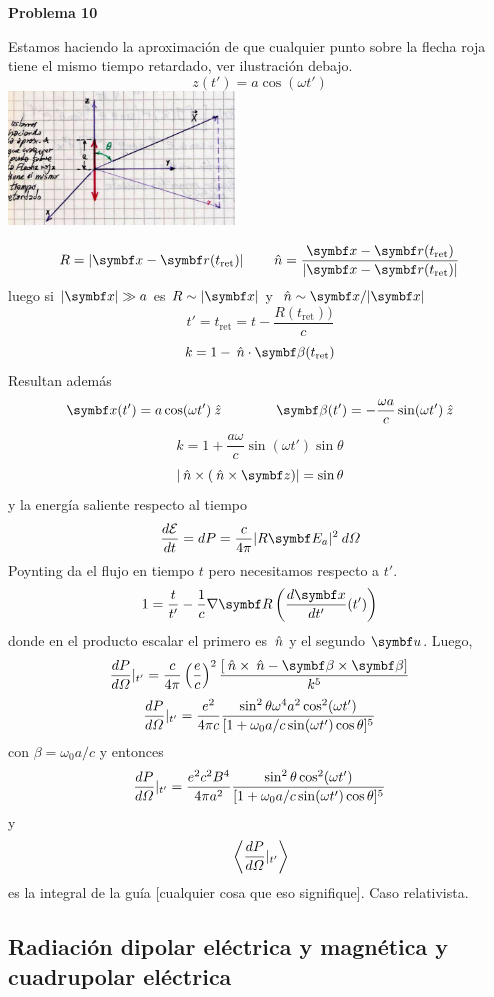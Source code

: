 \documentclass[10pt,oneside]{CBFT_book}
\begin{document}
\begin{ejemplo}{\bf Problema 10}

Estamos haciendo la aproximación de que cualquier punto sobre la flecha roja tiene el mismo
tiempo retardado, ver ilustración debajo.
\[
	z(t') = a \cos( \omega t' )
\]
\includegraphics[width=0.45\textwidth]{images/fig_ft1_antena_probl.jpg}

\[
	R = | \vbx - \vb{r}(t_\text{ret}) | \qquad 
	\nver = \frac{ \vbx - \vb{r}(t_\text{ret}) }{| \vbx - \vb{r}(t_\text{ret}) |}
\]
luego si $|\vbx|\gg a$ es $ R \sim |\vbx| $ y $ \nver \sim \vbx/|\vbx|$
\[
	t'= t_\text{ret} = t - \frac{R(t_\text{ret}))}{c}
\]
\[
	k = 1 - \nver\cdot\vb{\b}(t_\text{ret})
\]
Resultan además
\[
	\vb{x}(t') = a \cos(\omega t') \zver \qquad \qquad 
	\vb{\b}(t') = - \frac{\omega a}{c} \sin(\omega t')\zver
\]
\[
	k = 1 + \frac{a\omega}{c}\sin(\omega t')\sin\theta
\]
\[
	|\nver\times(\nver\times\vb{z})| = \sin\theta
\]
y la energía saliente respecto al tiempo 
\[
	\dtot{\mathcal{E}}{t} = dP = \frac{c}{4\pi} | R \vb{E}_a |^2 \: d\Omega
\]
Poynting da el flujo en tiempo $t$ pero necesitamos respecto a $t'$.
\[
	1 = \frac{t}{t'} - \frac{1}{c} \nabla\vb{R} \left( \dtot{\vbx}{t'}(t') \right)
\]
donde en el producto escalar el primero es $\:\hat{n}$ y el segundo $\vb u$. Luego,
\[
	\dtot{P}{\Omega}|_{t'} = \frac{ c }{ 4 \pi } \Frac{e}{c}^2 
	\frac{[ \nver \times {\nver - \vb{\b}}\times\vb{\b}]}{k^5}
\]
\[
	\frac{d^{\hspace{-0.05em}} {P}}{d {\Omega}^{\hspace{-0.05em}}}|_{t'} = \frac{ e^2 }{ 4 \pi c}
	\frac{ \sin^2\theta \omega^4 a^2 \cos^2(\omega t')}
	{[ 1 + \omega_0 a/c \sin(\omega t')\cos\theta ]^5}
\]
con $\beta = \omega_0 a / c $ y entonces
\[
	\frac{d^{\hspace{-0.05em}} {P}}{d {\Omega}^{\hspace{-0.05em}}}|_{t'} = \frac{ e^2 c^2 B^4}{4 \pi a^2}
	\frac{\sin^2\theta  \cos^2(\omega t')}	{[ 1 + \omega_0 a/c \sin(\omega t')\cos\theta ]^5}
\]
y 
\[
	\:\left\langle  \frac{d^{\hspace{-0.05em}} {P}}{d {\Omega}^{\hspace{-0.05em}}}|_{t'}  \right\rangle
\]
es la integral de la guía [cualquier cosa que eso signifique]. Caso relativista.

\end{ejemplo}

\subsection{Radiación dipolar eléctrica y magnética y cuadrupolar eléctrica}
\end{document}
